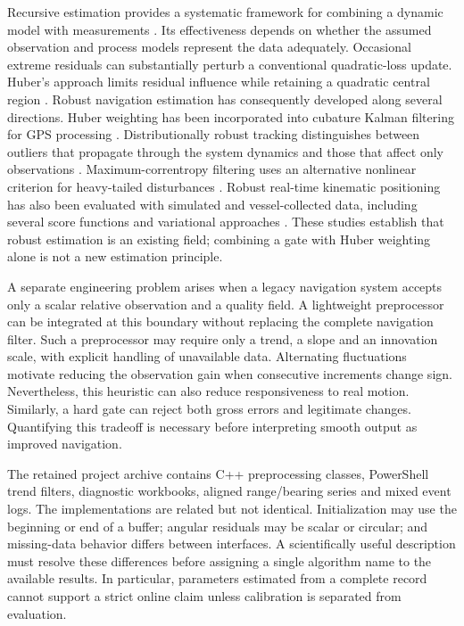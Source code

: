 \documentclass[12pt,a4paper]{article}
\begin{document}
Recursive estimation provides a systematic framework for combining a dynamic model with measurements \cite{kalman}. Its effectiveness depends on whether the assumed observation and process models represent the data adequately. Occasional extreme residuals can substantially perturb a conventional quadratic-loss update. Huber's approach limits residual influence while retaining a quadratic central region \cite{huber}. Robust navigation estimation has consequently developed along several directions. Huber weighting has been incorporated into cubature Kalman filtering for GPS processing \cite{tseng}. Distributionally robust tracking distinguishes between outliers that propagate through the system dynamics and those that affect only observations \cite{ruckdeschel}. Maximum-correntropy filtering uses an alternative nonlinear criterion for heavy-tailed disturbances \cite{chen}. Robust real-time kinematic positioning has also been evaluated with simulated and vessel-collected data, including several score functions and variational approaches \cite{medina}. These studies establish that robust estimation is an existing field; combining a gate with Huber weighting alone is not a new estimation principle.

A separate engineering problem arises when a legacy navigation system accepts only a scalar relative observation and a quality field. A lightweight preprocessor can be integrated at this boundary without replacing the complete navigation filter. Such a preprocessor may require only a trend, a slope and an innovation scale, with explicit handling of unavailable data. Alternating fluctuations motivate reducing the observation gain when consecutive increments change sign. Nevertheless, this heuristic can also reduce responsiveness to real motion. Similarly, a hard gate can reject both gross errors and legitimate changes. Quantifying this tradeoff is necessary before interpreting smooth output as improved navigation.

The retained project archive contains C++ preprocessing classes, PowerShell trend filters, diagnostic workbooks, aligned range/bearing series and mixed event logs. The implementations are related but not identical. Initialization may use the beginning or end of a buffer; angular residuals may be scalar or circular; and missing-data behavior differs between interfaces. A scientifically useful description must resolve these differences before assigning a single algorithm name to the available results. In particular, parameters estimated from a complete record cannot support a strict online claim unless calibration is separated from evaluation.
\end{document}
